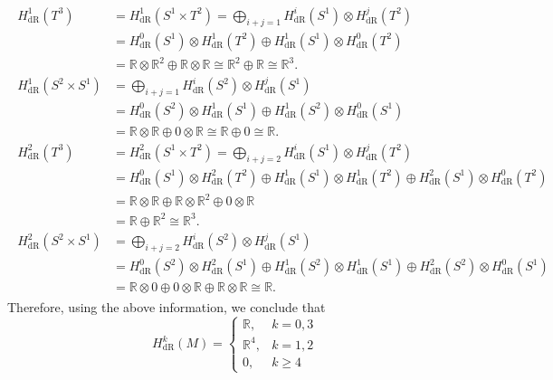 \documentclass{article}
\begin{document}
	\begin{align*}
		\begin{split}
			H^{1}_{\text{dR}}(T^{3}) &= H^{1}_{\text{dR}}(S^{1} \times T^{2}) = \bigoplus_{i + j = 1}H^{i}_{\text{dR}}(S^{1}) \otimes H^{j}_{\text{dR}}(T^{2}) \\
			&= H^{0}_{\text{dR}}(S^{1}) \otimes H^{1}_{\text{dR}}(T^{2}) \oplus H^{1}_{\text{dR}}(S^{1}) \otimes H^{0}_{\text{dR}}(T^{2}) \\
			&= \mathbb{R} \otimes \mathbb{R}^{2} \oplus \mathbb{R} \otimes \mathbb{R} \cong \mathbb{R}^{2} \oplus \mathbb{R} \cong \mathbb{R}^{3}.\\
			H^{1}_{\text{dR}}(S^{2} \times S^{1}) &= \bigoplus_{i + j = 1}H^{i}_{\text{dR}}(S^{2}) \otimes H^{j}_{\text{dR}}(S^{1}) \\
			&= H^{0}_{\text{dR}}(S^{2}) \otimes H^{1}_{\text{dR}}(S^{1}) \oplus H^{1}_{\text{dR}}(S^{2}) \otimes H^{0}_{\text{dR}}(S^{1}) \\
			&= \mathbb{R} \otimes \mathbb{R} \oplus 0 \otimes \mathbb{R} \cong \mathbb{R} \oplus 0 \cong \mathbb{R}. \\
			H^{2}_{\text{dR}}(T^{3}) &= H^{2}_{\text{dR}}(S^{1} \times T^{2}) = \bigoplus_{i + j = 2}H^{i}_{\text{dR}}(S^{1}) \otimes H^{j}_{\text{dR}}(T^{2}) \\
			&= H^{0}_{\text{dR}}(S^{1}) \otimes H^{2}_{\text{dR}}(T^{2}) \oplus H^{1}_{\text{dR}}(S^{1}) \otimes H^{1}_{\text{dR}}(T^{2}) \oplus H^{2}_{\text{dR}}(S^{1}) \otimes H^{0}_{\text{dR}}(T^{2}) \\
			&= \mathbb{R} \otimes \mathbb{R} \oplus \mathbb{R} \otimes \mathbb{R}^{2} \oplus 0 \otimes \mathbb{R} \\
			&= \mathbb{R} \oplus \mathbb{R}^{2} \cong \mathbb{R}^{3}. \\
			H^{2}_{\text{dR}}(S^{2} \times S^{1}) &= \bigoplus_{i + j = 2}H^{i}_{\text{dR}}(S^{2}) \otimes H^{j}_{\text{dR}}(S^{1}) \\
			&= H^{0}_{\text{dR}}(S^{2}) \otimes H^{2}_{\text{dR}}(S^{1}) \oplus H^{1}_{\text{dR}}(S^{2}) \otimes H^{1}_{\text{dR}}(S^{1}) \oplus H^{2}_{\text{dR}}(S^{2}) \otimes H^{0}_{\text{dR}}(S^{1}) \\
			&= \mathbb{R} \otimes 0 \oplus 0 \otimes \mathbb{R} \oplus \mathbb{R} \otimes \mathbb{R} \cong \mathbb{R}. 
		\end{split}
	\end{align*}
	Therefore, using the above information, we conclude that 
	\begin{equation*}
		H^{k}_{\text{dR}}(M) = 
		\begin{cases}
			\mathbb{R}, & k =0, 3 \\
			\mathbb{R}^{4}, & k = 1, 2 \\
			0, & k \geq 4
		\end{cases}
	\end{equation*}
	
\end{document}
